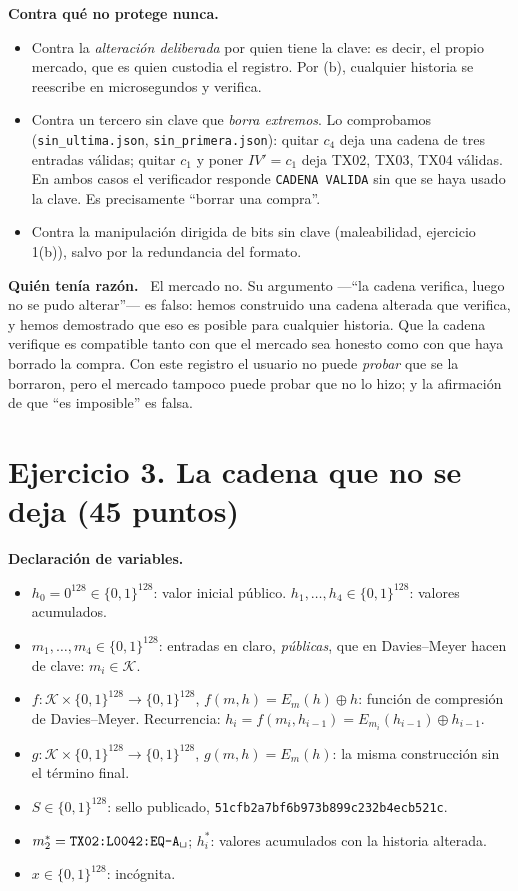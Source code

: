 \documentclass[11pt,letterpaper]{article}
\newcommand{\xor}{\oplus}
\newcommand{\B}{\{0,1\}^{128}}
\newcommand{\paso}[1]{\par\smallskip\noindent\textbf{#1.}\ }
\newenvironment{declaracion}{\par\medskip\noindent\textbf{Declaración de variables.}\begin{itemize}[leftmargin=1.5em,itemsep=1pt]}{\end{itemize}}
\begin{document}
\paso{Contra qué no protege nunca}
\begin{itemize}[itemsep=2pt]
  \item Contra la \emph{alteración deliberada} por quien tiene la clave: es decir, el propio mercado, que es
        quien custodia el registro. Por (b), cualquier historia se reescribe en microsegundos y verifica.
  \item Contra un tercero sin clave que \emph{borra extremos}. Lo comprobamos
        (\texttt{sin\_ultima.json}, \texttt{sin\_primera.json}): quitar $c_4$ deja una cadena de tres
        entradas válidas; quitar $c_1$ y poner $IV' = c_1$ deja TX02, TX03, TX04 válidas. En ambos casos el
        verificador responde \texttt{CADENA VALIDA} sin que se haya usado la clave. Es precisamente
        ``borrar una compra''.
  \item Contra la manipulación dirigida de bits sin clave (maleabilidad, ejercicio 1(b)), salvo por la
        redundancia del formato.
\end{itemize}

\paso{Quién tenía razón}
El mercado no. Su argumento ---``la cadena verifica, luego no se pudo alterar''--- es falso: hemos
construido una cadena alterada que verifica, y hemos demostrado que eso es posible para cualquier
historia. Que la cadena verifique es compatible tanto con que el mercado sea honesto como con que haya
borrado la compra. Con este registro el usuario no puede \emph{probar} que se la borraron, pero el
mercado tampoco puede probar que no lo hizo; y la afirmación de que ``es imposible'' es falsa.

\section{Ejercicio 3. La cadena que no se deja \hfill (45 puntos)}

\begin{declaracion}
  \item $h_0 = 0^{128}\in\B$: valor inicial público. $h_1,\dots,h_4\in\B$: valores acumulados.
  \item $m_1,\dots,m_4\in\B$: entradas en claro, \emph{públicas}, que en Davies--Meyer hacen de clave:
        $m_i\in\mathcal{K}$.
  \item $f:\mathcal{K}\times\B\to\B$, $f(m,h) = E_m(h)\xor h$: función de compresión de Davies--Meyer.
        Recurrencia: $h_i = f(m_i,h_{i-1}) = E_{m_i}(h_{i-1})\xor h_{i-1}$.
  \item $g:\mathcal{K}\times\B\to\B$, $g(m,h)=E_m(h)$: la misma construcción sin el término final.
  \item $S\in\B$: sello publicado, \texttt{51cfb2a7bf6b973b899c232b4ecb521c}.
  \item $m_2^* = \texttt{TX02:L0042:EQ-A\textvisiblespace}$; $h_i^*$: valores acumulados con la historia alterada.
  \item $x\in\B$: incógnita.
\end{declaracion}
\end{document}
